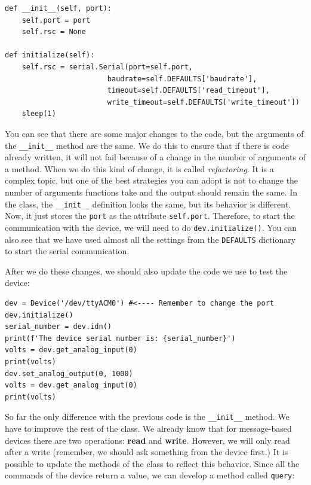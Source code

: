 \begin{verbatim}
def __init__(self, port):
    self.port = port
    self.rsc = None

def initialize(self):
    self.rsc = serial.Serial(port=self.port,
                        baudrate=self.DEFAULTS['baudrate'],
                        timeout=self.DEFAULTS['read_timeout'],
                        write_timeout=self.DEFAULTS['write_timeout'])
    sleep(1)
\end{verbatim}

You can see that there are some major changes to the code, but the arguments of the \texttt{__init__} method are the same. We do this
to ensure that if there is code already written, it will not fail because of a change in the number of arguments of a method. When we do this kind of change, it is called \emph{refactoring}. It is a complex topic, but one of the best strategies you can adopt is not to change the number of arguments functions take and the output should remain the same. In the class, the \texttt{__init__} definition looks the same, but its behavior is different. Now, it just stores the \texttt{port} as the attribute \texttt{self.port}. Therefore, to start the communication with the device, we will need to do \texttt{dev.initialize()}. You can also see that we have used almost all the settings from the \texttt{DEFAULTS} dictionary to start the serial communication.

After we do these changes, we should also update the code we use to test the device: 

\begin{verbatim}
dev = Device('/dev/ttyACM0') #<---- Remember to change the port
dev.initialize()
serial_number = dev.idn()
print(f'The device serial number is: {serial_number}')
volts = dev.get_analog_input(0)
print(volts)
dev.set_analog_output(0, 1000)
volts = dev.get_analog_input(0)
print(volts)
\end{verbatim}

So far the only difference with the previous code is the \texttt{__init__} method. We have to improve the rest of the class. We already know that for message-based devices there are two operations: \textbf{read} and \textbf{write}. However, we will only read after a write (remember, we should ask something from the device first.) It is possible to update the methods of the class to reflect this behavior. Since all the commands of the device return a value, we can develop a method called \texttt{query}:

